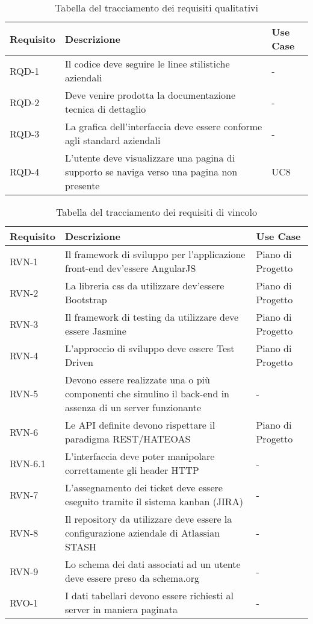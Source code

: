 \begin{table}%
\caption{Tabella del tracciamento dei requisiti qualitativi}
\label{tab:requisiti-qualitativi}
\begin{tabularx}{\textwidth}{lXl}
\hline\hline
\textbf{Requisito} & \textbf{Descrizione} & \textbf{Use Case}\\
\hline
RQD-1 & Il codice deve seguire le linee stilistiche aziendali & - \\
\hline
RQD-2 & Deve venire prodotta la documentazione tecnica di dettaglio & - \\
\hline
RQD-3 & La grafica dell'interfaccia deve essere conforme agli standard aziendali & - \\
\hline
RQD-4 & L'utente deve visualizzare una pagina di supporto se naviga verso una pagina non presente & UC8 \\
\hline
\end{tabularx}
\end{table}%

\begin{table}%
\caption{Tabella del tracciamento dei requisiti di vincolo}
\label{tab:requisiti-vincolo}
\begin{tabularx}{\textwidth}{lXl}
\hline\hline
\textbf{Requisito} & \textbf{Descrizione} & \textbf{Use Case}\\
\hline
RVN-1 & Il framework di sviluppo per l'applicazione \gls{front-end} dev'essere AngularJS & Piano di Progetto \\
\hline
RVN-2 & La libreria \gls{css} da utilizzare dev'essere Bootstrap & Piano di Progetto \\
\hline
RVN-3 & Il framework di testing da utilizzare deve essere Jasmine & Piano di Progetto \\
\hline
RVN-4 & L'approccio di sviluppo deve essere Test Driven & Piano di Progetto \\
\hline
RVN-5 & Devono essere realizzate una o più componenti che simulino il \gls{back-end} in assenza di un server funzionante & - \\
\hline
RVN-6 & Le API definite devono rispettare il paradigma REST/HATEOAS & Piano di Progetto \\
\hline
RVN-6.1 & L'interfaccia deve poter manipolare correttamente gli header HTTP & - \\
\hline
RVN-7 & L'assegnamento dei ticket deve essere eseguito tramite il sistema kanban (JIRA) & - \\
\hline
RVN-8 & Il repository da utilizzare deve essere la configurazione aziendale di Atlassian STASH & - \\
\hline
RVN-9 & Lo schema dei dati associati ad un utente deve essere preso da schema.org & - \\
\hline
RVO-1 & I dati tabellari devono essere richiesti al server in maniera paginata & - \\
\hline
\end{tabularx}
\end{table}%

